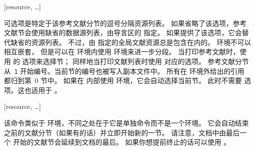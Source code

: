 \begin{ltxsyntax}

[resource, \dots]


可选项是特定于该参考文献分节的逗号分隔资源列表。
如果省略了该选项，参考文献节会使用缺省的数据源列表，由导言区的  指定。
如果提供了该选项，它会替代缺省的资源列表。
不过，由  指定的全局文献资源总是包含在内的。
 环境不可以相互嵌套，
但是可以在  环境内使用  环境来进一步分段。
当打印参考文献时，使用  的  选项来选择节；
同样地当打印文献列表时使用  对应的选项。
参考文献分节从~\texttt{1} 开始编号。当前节的编号也被写入副本文件中。
所有在  环境外给出的引用都归到第~0 节中。
如果在  内部使用  环境，它会自动选择当前节。
此时不需要  选项。这也适用于 。

[resource, \dots]


该命令类似于  环境，不同之处在于它是单独命令而不是一个环境。
它会自动结束之前的文献分节（如果有的话）并立即开始新的一节。
请注意，文档中由最后一个  开始的文献节会延续到文档的最后。
如果你想提前终止的话可以使用 。

\end{ltxsyntax}

